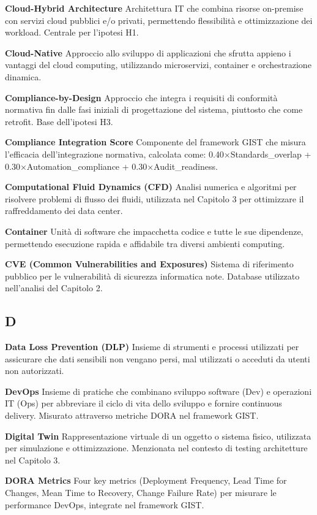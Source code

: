 \documentclass{report}
\begin{document}
\textbf{Cloud-Hybrid Architecture} Architettura IT che combina risorse
on-premise con servizi cloud pubblici e/o privati, permettendo
flessibilità e ottimizzazione dei workload. Centrale per l'ipotesi H1.

\textbf{Cloud-Native} Approccio allo sviluppo di applicazioni che
sfrutta appieno i vantaggi del cloud computing, utilizzando
microservizi, container e orchestrazione dinamica.

\textbf{Compliance-by-Design} Approccio che integra i requisiti di
conformità normativa fin dalle fasi iniziali di progettazione del
sistema, piuttosto che come retrofit. Base dell'ipotesi H3.

\textbf{Compliance Integration Score} Componente del framework GIST che
misura l'efficacia dell'integrazione normativa, calcolata come:
0.40×Standards\_overlap + 0.30×Automation\_compliance +
0.30×Audit\_readiness.

\textbf{Computational Fluid Dynamics (CFD)} Analisi numerica e algoritmi
per risolvere problemi di flusso dei fluidi, utilizzata nel Capitolo 3
per ottimizzare il raffreddamento dei data center.

\textbf{Container} Unità di software che impacchetta codice e tutte le
sue dipendenze, permettendo esecuzione rapida e affidabile tra diversi
ambienti computing.

\textbf{CVE (Common Vulnerabilities and Exposures)} Sistema di
riferimento pubblico per le vulnerabilità di sicurezza informatica note.
Database utilizzato nell'analisi del Capitolo 2.

\subsection{D}\label{d}

\textbf{Data Loss Prevention (DLP)} Insieme di strumenti e processi
utilizzati per assicurare che dati sensibili non vengano persi, mal
utilizzati o acceduti da utenti non autorizzati.

\textbf{DevOps} Insieme di pratiche che combinano sviluppo software
(Dev) e operazioni IT (Ops) per abbreviare il ciclo di vita dello
sviluppo e fornire continuous delivery. Misurato attraverso metriche
DORA nel framework GIST.

\textbf{Digital Twin} Rappresentazione virtuale di un oggetto o sistema
fisico, utilizzata per simulazione e ottimizzazione. Menzionata nel
contesto di testing architetture nel Capitolo 3.

\textbf{DORA Metrics} Four key metrics (Deployment Frequency, Lead Time
for Changes, Mean Time to Recovery, Change Failure Rate) per misurare le
performance DevOps, integrate nel framework GIST.
\end{document}
